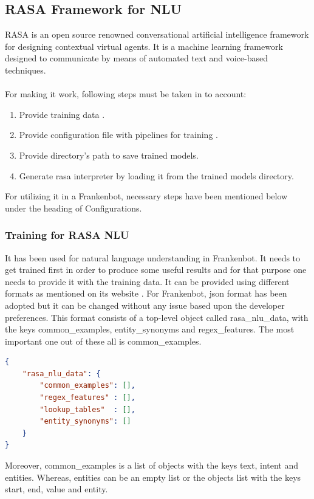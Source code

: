 \subsection{RASA Framework for NLU \label{subsec:rasanlu}}
RASA is an open source renowned conversational artificial intelligence framework for designing contextual virtual agents. It is a machine learning framework designed to communicate by means of automated text and voice-based techniques. \cite{rasa}
\\~\\
For making it work, following steps must be taken in to account:
\begin{enumerate}
    \item Provide training data \cite{rasatrainingdata}.
    \item Provide configuration file with pipelines for training \cite{rasapipeline}.
    \item Provide directory's path to save trained models.
    \item Generate rasa interpreter by loading it from the trained models directory.
\end{enumerate}
For utilizing it in a Frankenbot, necessary steps have been mentioned below under the heading of Configurations.
 
\subsubsection*{Training for RASA NLU}
It has been used for natural language understanding in Frankenbot. It needs to get trained first in order to produce some useful results and for that purpose one needs to provide it with the training data. It can be provided using different formats as mentioned on its website \cite{rasatrainingdata}. For Frankenbot, json format has been adopted but it can be changed without any issue based upon the developer preferences. This format consists of a top-level object called rasa\_nlu\_data, with the keys common\_examples, entity\_synonyms and regex\_features. The most important one out of these all is common\_examples.

\begin{lstlisting}[language=json,firstnumber=1]
{
    "rasa_nlu_data": {
        "common_examples": [],
        "regex_features" : [],
        "lookup_tables"  : [],
        "entity_synonyms": []
    }
}
\end{lstlisting}
 Moreover, common\_examples is a list of objects with the keys text, intent and entities. Whereas, entities can be an empty list or the objects list with the keys start, end, value and entity.
 
